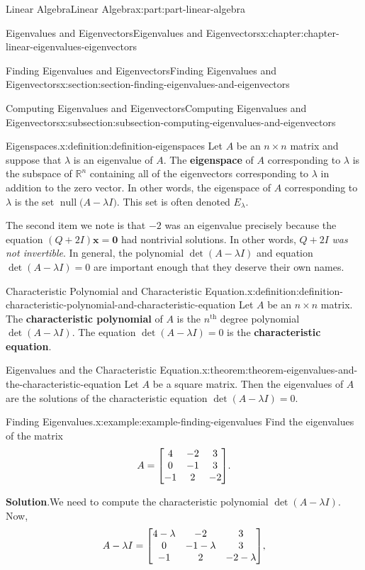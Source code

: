 \documentclass[twoside,10pt,]{book}
\newcommand{\blocktitlefont}{\relax}
\newcommand{\terminology}[1]{\textbf{#1}}
\numberwithin{equation}{part}
\newcommand{\RR}{\mathbb{R}}
\renewcommand{\th}{\text{th}}
\providecommand{\vb}[1]{\mathbf{#1}}
\newcommand{\nul}[1]{\operatorname{null}{#1}}
\begin{document}
\begin{partptx}{Linear Algebra}{}{Linear Algebra}{}{}{x:part:part-linear-algebra}
\begin{chapterptx}{Eigenvalues and Eigenvectors}{}{Eigenvalues and Eigenvectors}{}{}{x:chapter:chapter-linear-eigenvalues-eigenvectors}
\begin{sectionptx}{Finding Eigenvalues and Eigenvectors}{}{Finding Eigenvalues and Eigenvectors}{}{}{x:section:section-finding-eigenvalues-and-eigenvectors}
\begin{subsectionptx}{Computing Eigenvalues and Eigenvectors}{}{Computing Eigenvalues and Eigenvectors}{}{}{x:subsection:subsection-computing-eigenvalues-and-eigenvectors}
\begin{definition}{Eigenspaces.}{x:definition:definition-eigenspaces}
%
Let \(A\) be an \(n\times n\) matrix and suppose that \(\lambda\) is an eigenvalue of \(A\). The \terminology{eigenspace} of \(A\) corresponding to \(\lambda\) is the subspace of \(\RR^{n}\) containing all of the eigenvectors corresponding to \(\lambda\) in addition to the zero vector. In other words, the eigenspace of \(A\) corresponding to \(\lambda\) is the set \(\nul(A-\lambda I)\). This set is often denoted \(E_{\lambda}\).%
\end{definition}
The second item we note is that \(-2\) was an eigenvalue precisely because the equation \((Q+2I)\vb{x} = \vb{0}\) had nontrivial solutions. In other words, \(Q+2I\) \emph{was not invertible}. In general, the polynomial \(\det(A-\lambda I)\) and equation \(\det(A-\lambda I) = 0\) are important enough that they deserve their own names.%
\begin{definition}{Characteristic Polynomial and Characteristic Equation.}{x:definition:definition-characteristic-polynomial-and-characteristic-equation}%
%
Let \(A\) be an \(n\times n\) matrix. The \terminology{characteristic polynomial} of \(A\) is the \(n^\th\) degree polynomial \(\det(A-\lambda I)\). The equation \(\det(A-\lambda I) = 0\) is the \terminology{characteristic equation}.%
\end{definition}
\begin{theorem}{Eigenvalues and the Characteristic Equation.}{}{x:theorem:theorem-eigenvalues-and-the-characteristic-equation}%
Let \(A\) be a square matrix. Then the eigenvalues of \(A\) are the solutions of the characteristic equation \(\det(A - \lambda I) = 0\).%
\end{theorem}
\begin{example}{Finding Eigenvalues.}{x:example:example-finding-eigenvalues}%
Find the eigenvalues of the matrix%
\begin{equation*}
A = \mqty[4 & -2 & 3 \\ 0 & -1 & 3 \\ -1 & 2 & -2].
\end{equation*}
%
\par\smallskip%
\noindent\textbf{\blocktitlefont Solution}.\hypertarget{g:solution:idm1630887096}{}\quad{}We need to compute the characteristic polynomial \(\det(A-\lambda I)\). Now,%
\begin{equation*}
A - \lambda I = \mqty[4 - \lambda & -2 & 3 \\ 0 & -1-\lambda & 3 \\ -1 & 2 & -2 - \lambda],

\end{equation*}
\end{example}
\end{subsectionptx}
\end{sectionptx}
\end{chapterptx}
\end{partptx}
\end{document}
